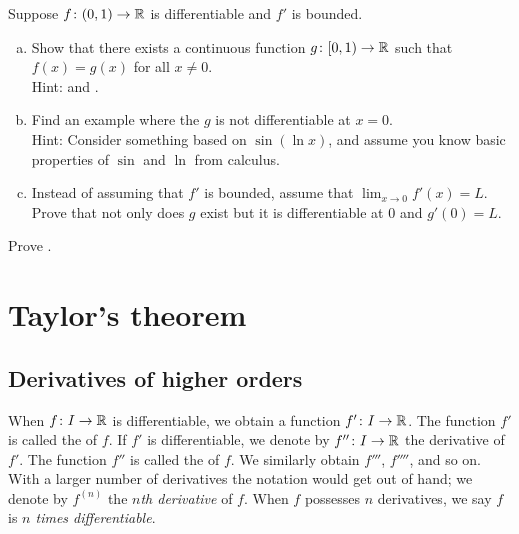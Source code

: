 \begin{exercise} \label{exercise:extendboundedder}
Suppose $f \colon (0,1) \to {\mathbb{R}}$ is differentiable and $f'$
is bounded.
\begin{enumerate}[a)]
\item
Show that there exists a continuous function $g \colon [0,1) \to {\mathbb{R}}$
such that $f(x) = g(x)$ for all $x \not= 0$.\\
Hint:  and
.
\item
Find an example where the $g$ is not differentiable at $x=0$.
\\
Hint: Consider something based on $\sin(\ln x)$,
and assume you know basic properties of
$\sin$ and $\ln$ from calculus.
\item
Instead of assuming that $f'$ is bounded, assume that $\lim_{x \to 0} f'(x)
= L$.  Prove that not only does $g$ exist but it is differentiable at $0$
and $g'(0) = L$.
\end{enumerate}
\end{exercise}

\begin{exercise}
Prove .
\end{exercise}


\sectionnewpage
\section{Taylor's theorem}
\label{sec:taylor}



\subsection{Derivatives of higher orders}

When $f \colon I \to {\mathbb{R}}$ is differentiable, we obtain a function
$f' \colon I \to {\mathbb{R}}$.  The function
$f'$ is called the \emph{} of $f$.
If $f'$ is differentiable, we denote by
$f'' \colon I \to {\mathbb{R}}$ the derivative of $f'$.  The function $f''$
is called the \emph{} of $f$.
We similarly obtain
$f'''$, $f''''$, and so on.
With a larger number of derivatives
the notation would get out of hand; we denote
by $f^{(n)}$ the
\emph{$n$th derivative} of $f$.
%
When $f$ possesses $n$ derivatives, we say $f$ is
\emph{$n$ times differentiable}.

